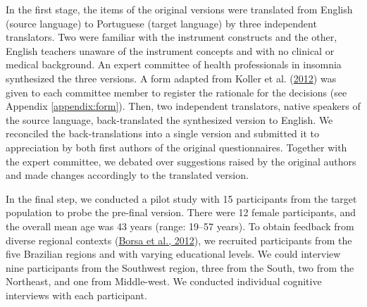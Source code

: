 \documentclass[
  ,doc,11pt, twoside,floatsintext]{apa6}
\begin{document}
In the first stage, the items of the original versions were translated from English (source language) to Portuguese (target language) by three independent translators. Two were familiar with the instrument constructs and the other, English teachers unaware of the instrument concepts and with no clinical or medical background. An expert committee of health professionals in insomnia synthesized the three versions. A form adapted from Koller et al. (\protect\hyperlink{ref-koller2012}{2012}) was given to each committee member to register the rationale for the decisions (see Appendix \ref{appendix:form}). Then, two independent translators, native speakers of the source language, back-translated the synthesized version to English. We reconciled the back-translations into a single version and submitted it to appreciation by both first authors of the original questionnaires. Together with the expert committee, we debated over suggestions raised by the original authors and made changes accordingly to the translated version.

In the final step, we conducted a pilot study with 15 participants from the target population to probe the pre-final version. There were 12 female participants, and the overall mean age was 43 years (range: 19--57 years). To obtain feedback from diverse regional contexts (\protect\hyperlink{ref-borsaAdaptacaoValidacaoInstrumentos2012}{Borsa et al., 2012}), we recruited participants from the five Brazilian regions and with varying educational levels. We could interview nine participants from the Southwest region, three from the South, two from the Northeast, and one from Middle-west. We conducted individual cognitive interviews with each participant.
\end{document}
